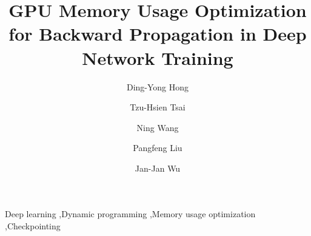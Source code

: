\documentclass[preprint,review,12pt,times,3p]{elsarticle}
\begin{document}
\BgThispage
\begin{frontmatter}

\title{GPU Memory Usage Optimization for Backward Propagation in Deep Network Training}


\author[inst2]{Ding-Yong Hong}
\author[inst1]{Tzu-Hsien Tsai}
\author[inst1]{Ning Wang}
\author[inst1]{Pangfeng Liu}
\author[inst2]{Jan-Jan Wu}




\begin{keyword}
Deep learning \sep Dynamic programming \sep Memory usage optimization \sep Checkpointing
\end{keyword}

\end{frontmatter}








 

\end{document}

